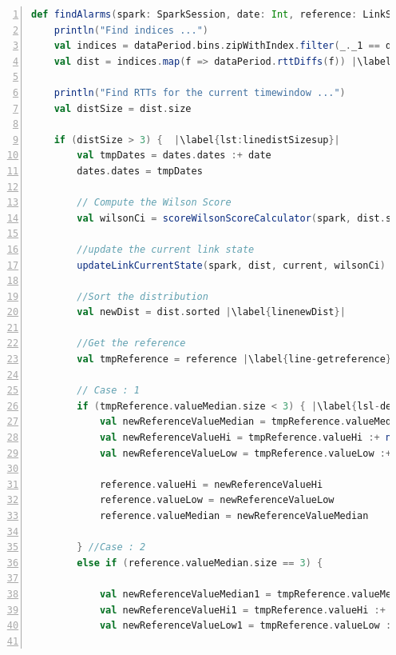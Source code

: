 \begin{lstlisting}[language=scala,firstnumber=1, caption={Définition de la méthode findAlarms},label={lst:findAlarmsFunction}, basicstyle = \footnotesize,escapechar=|,numbers=left,
stepnumber=1]
  def findAlarms(spark: SparkSession, date: Int, reference: LinkState, dataPeriod: SummarizedLink, current: LinkState, alarmsDates: AlarmsDates, alarmsValues: AlarmsValues, dates: AllDates): Unit = {
	println("Find indices ...")
	val indices = dataPeriod.bins.zipWithIndex.filter(_._1 == date).map(_._2) |\label{lst:lineindices}|
	val dist = indices.map(f => dataPeriod.rttDiffs(f)) |\label{lst:linedist}|
	
	println("Find RTTs for the current timewindow ...")
	val distSize = dist.size
	
	if (distSize > 3) {  |\label{lst:linedistSizesup}|
		val tmpDates = dates.dates :+ date
		dates.dates = tmpDates
		
		// Compute the Wilson Score
		val wilsonCi = scoreWilsonScoreCalculator(spark, dist.size).map(f => f * dist.size) |\label{lsl:linewilson}|
		
		//update the current link state
		updateLinkCurrentState(spark, dist, current, wilsonCi) |\label{lst:lineupdateLinkCurrentState}|
		
		//Sort the distribution
		val newDist = dist.sorted |\label{linenewDist}|
		
		//Get the reference
		val tmpReference = reference |\label{line-getreference}|
		
		// Case : 1
		if (tmpReference.valueMedian.size < 3) { |\label{lsl-debutcases}|
			val newReferenceValueMedian = tmpReference.valueMedian :+ current.valueMedian.last
			val newReferenceValueHi = tmpReference.valueHi :+ newDist(javatools.JavaTools.getIntegerPart(wilsonCi(1)))
			val newReferenceValueLow = tmpReference.valueLow :+ newDist(javatools.JavaTools.getIntegerPart(wilsonCi(0)))
			
			reference.valueHi = newReferenceValueHi
			reference.valueLow = newReferenceValueLow
			reference.valueMedian = newReferenceValueMedian
			
		} //Case : 2
		else if (reference.valueMedian.size == 3) {
			
			val newReferenceValueMedian1 = tmpReference.valueMedian :+ medianCalculator(tmpReference.valueMedian)
			val newReferenceValueHi1 = tmpReference.valueHi :+ medianCalculator(tmpReference.valueHi)
			val newReferenceValueLow1 = tmpReference.valueLow :+ medianCalculator(tmpReference.valueLow)
			

\end{lstlisting}
